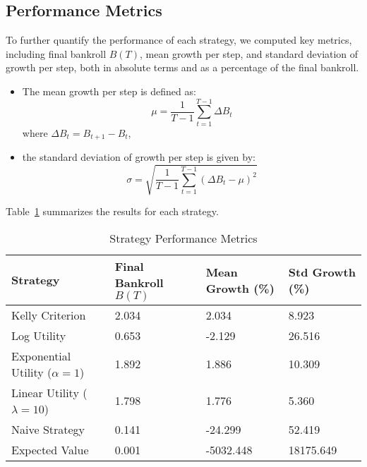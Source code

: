 \subsection{Performance Metrics}

To further quantify the performance of each strategy, we computed key metrics, including final bankroll \( B(T) \), mean growth per step, and standard deviation of growth per step, both in absolute terms and as a percentage of the final bankroll. 
\begin{itemize}
    \item The mean growth per step is defined as:
    \[
    \mu = \frac{1}{T-1} \sum_{t=1}^{T-1} \Delta B_t
    \]
    where \( \Delta B_t = B_{t+1} - B_t \),
    \item the standard deviation of growth per step is given by:
    \[
    \sigma = \sqrt{\frac{1}{T-1} \sum_{t=1}^{T-1} (\Delta B_t - \mu)^2}
    \]
\end{itemize}


Table~\ref{tab:strategy_performance} summarizes the results for each strategy.

\begin{table}[H]
\centering
\caption{Strategy Performance Metrics}
\label{tab:strategy_performance}
\begin{tabular}{llll}
\toprule
\textbf{Strategy}              & \textbf{Final Bankroll \( B(T) \)} & \textbf{Mean Growth (\%)} & \textbf{Std Growth (\%)} \\ 
\midrule
Kelly Criterion                & 2.034                              & 2.034                      & 8.923                    \\ 
Log Utility                    & 0.653                              & -2.129                     & 26.516                   \\ 
Exponential Utility (\( \alpha = 1 \)) & 1.892                        & 1.886                      & 10.309                   \\ 
Linear Utility (\( \lambda = 10 \))    & 1.798                        & 1.776                      & 5.360                    \\ 
Naive Strategy                 & 0.141                              & -24.299                    & 52.419                   \\ 
Expected Value                 & 0.001                              & -5032.448                  & 18175.649                \\
\bottomrule
\end{tabular}
\end{table}


